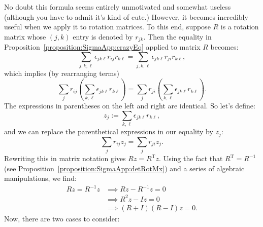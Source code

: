 No doubt this formula seems entirely unmotivated and somewhat useless (although you have to admit it's kind of cute.)  However, it becomes incredibly useful when we apply it to rotation matrices. To this end, suppose $R$ is a rotation matrix whose $(j,k)$ entry is denoted by $r_{jk}$. 
Then the equality in Proposition~\ref{proposition:SigmaApp:crazyEq} applied to matrix $R$  becomes:
\[ \sum_{j,k,\ell}\epsilon_{jk\ell} r_{ij}r_{k\ell} =  \sum_{j,k,\ell}\epsilon_{jk\ell} r_{ji}r_{k\ell}, \]
which implies (by rearranging terms)
\[ \sum_{j}r_{ij} \left( \sum_{k,\ell} \epsilon_{jk\ell} r_{k\ell} \right) 
=  \sum_{j}r_{ji} \left( \sum_{k,\ell} \epsilon_{jk\ell} r_{k\ell} \right). \]
The expressions in parentheses on the left and right are identical. So let's define:
\[ z_j :=  \sum_{k,\ell}\epsilon_{jk\ell} r_{k\ell}, \]
and we can replace the parenthetical expressions in our equality by $z_j$:
\[ \sum_{j}r_{ij} z_j=  \sum_{j}r_{ji} z_j. \]
Rewriting this in matrix notation gives $Rz = R^{\text{T}}z$. Using the fact that $R^{\text{T}} = R^{-1}$ (see Proposition~\ref{proposition:SigmaApp:detRotMx}) and a series of algebraic manipulations,  we find:
\begin{align*}
 Rz = R^{-1}z &\implies  Rz - R^{-1}z = 0 \\
&\implies R^2z - Iz = 0\\
& \implies  (R + I)(R-I)z = 0.
\end{align*}
Now, there are two cases to consider:
